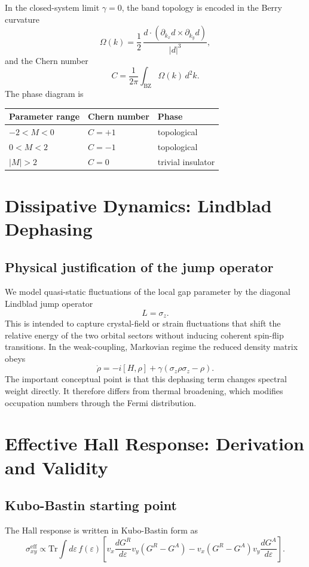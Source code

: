 \documentclass[11pt]{article}
\newcommand{\BZ}{\mathrm{BZ}}
\newcommand{\sigmaeff}{\sigma_{xy}^{\mathrm{eff}}}
\newcommand{\Ohm}{\Omega}
\begin{document}
In the closed-system limit $\gamma=0$, the band topology is encoded in the Berry curvature
\[
\Ohm(k)=\frac{1}{2}\,\frac{d\cdot(\partial_{k_x}d\times\partial_{k_y}d)}{|d|^3},
\]
and the Chern number
\[
C=\frac{1}{2\pi}\int_{\BZ}\Ohm(k)\,d^2k.
\]
The phase diagram is
\begin{center}
\begin{tabular}{lll}
\toprule
Parameter range & Chern number & Phase \\
\midrule
$-2<M<0$ & $C=+1$ & topological \\
$0<M<2$ & $C=-1$ & topological \\
$|M|>2$ & $C=0$ & trivial insulator \\
\bottomrule
\end{tabular}
\end{center}

\section{Dissipative Dynamics: Lindblad Dephasing}

\subsection{Physical justification of the jump operator}

We model quasi-static fluctuations of the local gap parameter by the diagonal Lindblad jump operator
\[
L=\sigma_z.
\]
This is intended to capture crystal-field or strain fluctuations that shift the relative energy of the two orbital sectors without inducing coherent spin-flip transitions. In the weak-coupling, Markovian regime the reduced density matrix obeys
\[
\dot{\rho}=-i[H,\rho]+\gamma(\sigma_z\rho\sigma_z-\rho).
\]
The important conceptual point is that this dephasing term changes spectral weight directly. It therefore differs from thermal broadening, which modifies occupation numbers through the Fermi distribution.

\section{Effective Hall Response: Derivation and Validity}

\subsection{Kubo-Bastin starting point}

The Hall response is written in Kubo-Bastin form as
\[
\sigmaeff \propto
\mathrm{Tr}\int d\varepsilon\,f(\varepsilon)\left[
v_x\frac{dG^R}{d\varepsilon}v_y(G^R-G^A)
-v_x(G^R-G^A)v_y\frac{dG^A}{d\varepsilon}
\right].
\]
\end{document}

